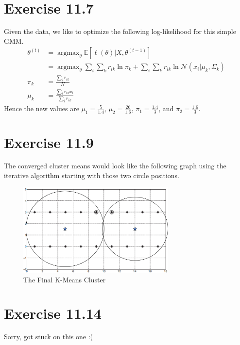 \documentclass[11pt, letterpaper]{article}
\begin{document}
\section{Exercise 11.7}
Given the data, we like to optimize the following log-likelihood for this simple GMM.
\begin{align*}
    \theta^{(t)} &= \mathop{\arg\max}_{\theta} \mathbb{E}[\ell(\theta)|X, \theta^{(t-1)}] \\
        &= \mathop{\arg\max}_{\theta} \sum_i \sum_k r_{ik} \ln \pi_k + \sum_i \sum_k r_{ik} \ln \mathcal{N}(x_i|\mu_k, \Sigma_{k}) \\
    \pi_k &= \frac{\sum_i r_{ik}}{N} \\
    \mu_k &= \frac{\sum_i r_{ik}x_i}{\sum_i r_{ik}}
\end{align*}
Hence the new values are $\mu_1 = \frac{5}{1.4}$, $\mu_2 = \frac{26}{1.6}$, $\pi_1 = \frac{1.4}{3}$, and $\pi_2 = \frac{1.6}{3}$.


\section{Exercise 11.9}
The converged cluster means would look like the following graph using the iterative algorithm starting with those two circle positions.
\begin{figure}[!h]
  \centering
  \includegraphics[width=0.7\textwidth]{11.9.png}
  \captionsetup{justification=centering}
  \caption{The Final K-Means Cluster}
\end{figure}


\section{Exercise 11.14}
Sorry, got stuck on this one :(
\end{document}

